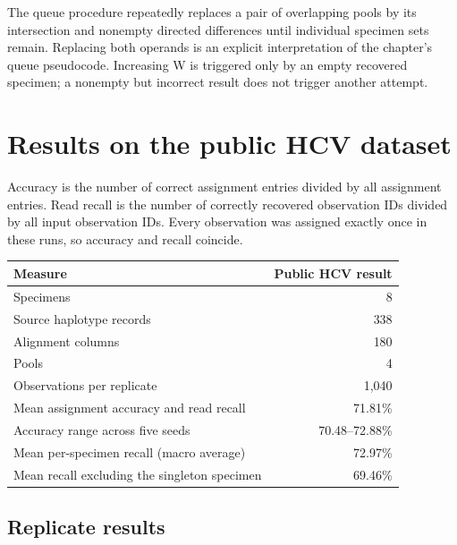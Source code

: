 The queue procedure repeatedly replaces a pair of overlapping pools by
its intersection and nonempty directed differences until individual
specimen sets remain. Replacing both operands is an explicit
interpretation of the chapter's queue pseudocode. Increasing W is
triggered only by an empty recovered specimen; a nonempty but incorrect
result does not trigger another attempt.

\hypertarget{results-on-the-public-hcv-dataset}{%
\section{Results on the public HCV
dataset}\label{results-on-the-public-hcv-dataset}}

Accuracy is the number of correct assignment entries divided by all
assignment entries. Read recall is the number of correctly recovered
observation IDs divided by all input observation IDs. Every observation
was assigned exactly once in these runs, so accuracy and recall
coincide.

\begin{longtable}[]{@{}lr@{}}
\toprule\noalign{}
Measure & Public HCV result \\
\midrule\noalign{}
\endhead
\bottomrule\noalign{}
\endlastfoot
Specimens & 8 \\
Source haplotype records & 338 \\
Alignment columns & 180 \\
Pools & 4 \\
Observations per replicate & 1,040 \\
Mean assignment accuracy and read recall & 71.81\% \\
Accuracy range across five seeds & 70.48--72.88\% \\
Mean per-specimen recall (macro average) & 72.97\% \\
Mean recall excluding the singleton specimen & 69.46\% \\
\end{longtable}

\hypertarget{replicate-results}{%
\subsection{Replicate results}\label{replicate-results}}

